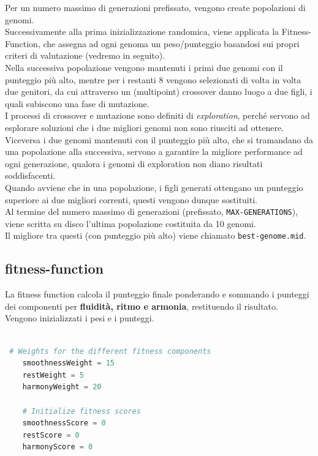 \documentclass[a4paper,12pt]{report}
\begin{document}
Per un numero massimo di generazioni prefissato, vengono create popolazioni di genomi. \\
Successivamente alla prima inizializzazione randomica, viene applicata la Fitness-Function, che assegna ad ogni genoma un peso/punteggio basandosi sui propri criteri di valutazione (vedremo in seguito). \\
Nella successiva popolazione vengono mantenuti i primi due genomi con il punteggio più alto, mentre per i restanti 8 vengono selezionati di volta in volta due genitori, da cui attraverso un (multipoint) crossover danno luogo a due figli, i quali subiscono una fase di mutazione. \\
I processi di crossover e mutazione sono definiti di \textit{exploration}, perché servono ad esplorare soluzioni che i due migliori genomi non sono riusciti ad ottenere. \\
Viceversa i due genomi mantenuti con il punteggio più alto, che si tramandano da una popolazione alla successiva, servono a garantire la migliore performance ad ogni generazione, qualora i genomi di exploration non diano risultati soddisfacenti. \\
Quando avviene che in una popolazione, i figli generati ottengano un punteggio superiore ai due migliori correnti, questi vengono dunque sostituiti. \\
Al termine del numero massimo di generazioni (prefissato, \texttt{MAX-GENERATIONS}), viene scritta su disco l'ultima popolazione costituita da 10 genomi. \\
Il migliore tra questi (con punteggio più alto) viene chiamato \texttt{best-genome.mid}. 

\subsection{fitness-function}

La fitness function calcola il punteggio finale ponderando e sommando i punteggi dei componenti per \textbf{fluidità, ritmo e armonia}, restituendo il risultato. \\
Vengono inizializzati i pesi e i punteggi.

\begin{lstlisting}[language=Python]

 # Weights for the different fitness components
    smoothnessWeight = 15
    restWeight = 5
    harmonyWeight = 20

    # Initialize fitness scores
    smoothnessScore = 0
    restScore = 0
    harmonyScore = 0
    
\end{lstlisting}
\end{document}
